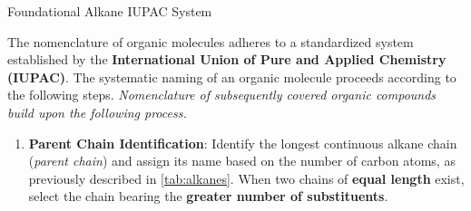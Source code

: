 \documentclass[10pt]{article}
\begin{document}
      \begin{core}[label=core:alkane_iupac]{Foundational Alkane IUPAC System}

        The nomenclature of organic molecules adheres to a standardized system established by the \textbf{International Union of Pure and Applied Chemistry (IUPAC)}. The systematic naming of an organic molecule proceeds according to the following steps. \textit{Nomenclature of subsequently covered organic compounds build upon the following process.}

        \begin{enumerate}[label=(\arabic*)]

          \item \textbf{Parent Chain Identification}: Identify the longest continuous alkane chain (\textit{parent chain}) and assign its name based on the number of carbon atoms, as previously described in \autoref{tab:alkanes}. When two chains of \textbf{equal length} exist, select the chain bearing the \textbf{greater number of substituents}.



\end{enumerate}
\end{core}
\end{document}
